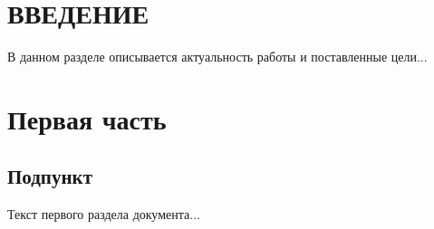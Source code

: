 \documentclass[paper=a4, fontsize=14pt, pagesize, DIV=calc, oneside]{scrreport}
\begin{document}
\pagestyle{empty} 



\newpage
\tableofcontents
\newpage

\pagestyle{plain}
\setcounter{page}{2} 



\chapter*{ВВЕДЕНИЕ}











В данном разделе описывается актуальность работы и поставленные цели...





\chapter{Первая часть}














\section{Подпункт}







Текст первого раздела документа...


\end{document}
